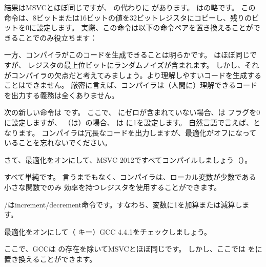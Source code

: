 \label{movzx}

結果はMSVCとほぼ同じですが、 \MOVSX の代わりに \MOVZX があります。 
\MOVZX はの略です。
この命令は、8ビットまたは16ビットの値を32ビットレジスタにコピーし、残りのビットを0に設定します。
実際、この命令は以下の命令ペアを置き換えることができることでのみ役立ちます：

一方、コンパイラがこのコードを生成できることは明らかです。
 はほぼ同じですが、
\EAX レジスタの最上位ビットにランダムノイズが含まれます。
しかし、それがコンパイラの欠点だと考えてみましょう。より理解しやすいコードを生成することはできません。
厳密に言えば、コンパイラは（人間に）理解できるコードを出力する義務は全くありません。


次の新しい命令は \SETNZ です。
ここで、 \AL にゼロが含まれていない場合、は \ZF フラグを0に設定しますが、
（は）の場合、 \SETNZ は \AL に1を設定します。
自然言語で言えば、となります。
コンパイラは冗長なコードを出力しますが、最適化がオフになっていることを忘れないでください。

\label{strlen_MSVC_Ox}

さて、最適化をオンにして、MSVC 2012ですべてコンパイルしましょう（\Ox）。



すべて単純です。
言うまでもなく、コンパイラは、ローカル変数が少数である小さな関数でのみ
効率を持つレジスタを使用することができます。

\INC/\DEC は\gls{increment}/\gls{decrement}命令です。すなわち、変数に1を加算または減算します。




最適化をオンにして（ \Othree キー）GCC 4.4.1をチェックしましょう。


 
ここで、GCCは \MOVZX の存在を除いてMSVCとほぼ同じです。 
しかし、ここでは \MOVZX をに置き換えることができます。

